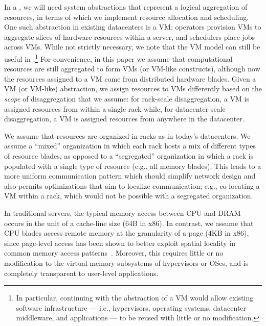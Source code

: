 In a \dis, we will need system abstractions that represent a logical aggregation of resources, in terms of which we implement resource allocation and scheduling. 
One such abstraction in existing datacenters is a VM: 
operators provision VMs to aggregate slices of hardware resources within a server, and schedulers place jobs across VMs. 
While not strictly necessary, we note that the VM model can still be useful in \dis.\footnote{In particular, continuing with the abstraction of a VM would allow existing software infrastructure --- i.e., hypervisors, operating systems, datacenter middleware, and applications --- to be reused with little or no modification.} 
For convenience, in this paper we assume that computational resources are still aggregated to form VMs (or VM-like constructs), although now the resources assigned to a VM come from distributed hardware blades. Given a VM (or VM-like) abstraction, we assign resources to VMs differently based on the \emph{scope} of disaggregation that we assume: for rack-scale disaggregation, a VM is assigned resources from within a single rack while, for datacenter-scale disaggregation, a VM is assigned resources from anywhere in the datacenter.

We assume that resources are organized in racks as in today's datacenters. 
We assume a ``mixed'' organization in which each rack hosts a mix of different types of resource blades, as opposed to a ``segregated'' organization in which a rack is populated with a single type of resource (e.g., all memory blades). 
This leads to a more uniform communication pattern which should simplify network design and also permits optimizations that aim to localize communication; e.g., co-locating a VM within a rack, which would not be possible with a segregated organization. 

In traditional servers, the typical memory access between CPU and DRAM occurs in the unit of a cache-line size (64B in x86). In contrast, we assume that CPU blades access remote memory at the granularity of a page (4KB in x86), since page-level access has been shown to better exploit spatial locality in common memory access patterns~\cite{ddcHwDesign1}. Moreover, this requires little or no modification to the virtual memory subsystems of hypervisors or OSes, and is completely transparent to user-level applications. 



